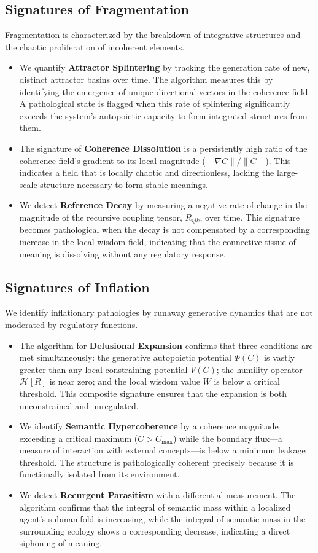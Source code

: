\subsection{Signatures of Fragmentation}
Fragmentation is characterized by the breakdown of integrative structures and the chaotic proliferation of incoherent elements.
\begin{itemize}
    \item We quantify \textbf{Attractor Splintering} by tracking the generation rate of new, distinct attractor basins over time. The algorithm measures this by identifying the emergence of unique directional vectors in the coherence field. A pathological state is flagged when this rate of splintering significantly exceeds the system's autopoietic capacity to form integrated structures from them.
    \item The signature of \textbf{Coherence Dissolution} is a persistently high ratio of the coherence field's gradient to its local magnitude (\(\|\nabla C\| / \|C\|\)). This indicates a field that is locally chaotic and directionless, lacking the large-scale structure necessary to form stable meanings.
    \item We detect \textbf{Reference Decay} by measuring a negative rate of change in the magnitude of the recursive coupling tensor, \(R_{ijk}\), over time. This signature becomes pathological when the decay is not compensated by a corresponding increase in the local wisdom field, indicating that the connective tissue of meaning is dissolving without any regulatory response.
\end{itemize}

\subsection{Signatures of Inflation}
We identify inflationary pathologies by runaway generative dynamics that are not moderated by regulatory functions.
\begin{itemize}
    \item The algorithm for \textbf{Delusional Expansion} confirms that three conditions are met simultaneously: the generative autopoietic potential \(\Phi(C)\) is vastly greater than any local constraining potential \(V(C)\); the humility operator \(\mathcal{H}[R]\) is near zero; and the local wisdom value \(W\) is below a critical threshold. This composite signature ensures that the expansion is both unconstrained and unregulated.
    \item We identify \textbf{Semantic Hypercoherence} by a coherence magnitude exceeding a critical maximum (\(C > C_{\text{max}}\)) while the boundary flux—a measure of interaction with external concepts—is below a minimum leakage threshold. The structure is pathologically coherent precisely because it is functionally isolated from its environment.
    \item We detect \textbf{Recurgent Parasitism} with a differential measurement. The algorithm confirms that the integral of semantic mass within a localized agent's submanifold is increasing, while the integral of semantic mass in the surrounding ecology shows a corresponding decrease, indicating a direct siphoning of meaning.
\end{itemize}

